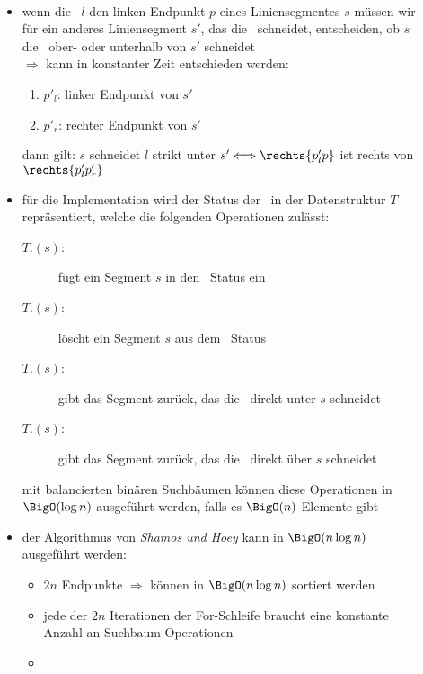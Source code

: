 \begin{description}
	\item[]\ \\\up\up
		\begin{itemize}
			\item wenn die \sweep~$l$ den linken Endpunkt $p$ eines Liniensegmentes $s$ müssen wir für ein anderes Liniensegment $s'$, das die \sweep~schneidet, entscheiden, ob $s$ die \sweep~ober- oder unterhalb von $s'$ schneidet\\
			$\Rightarrow$ kann in konstanter Zeit entschieden werden:
				\begin{enumerate}
					\item $p'_l$: linker Endpunkt von $s'$
					\item $p'_r$: rechter Endpunkt von $s'$
				\end{enumerate}
				dann gilt: $s$ schneidet $l$ strikt unter $s' \Longleftrightarrow \rechts{p'_lp}$ ist rechts von $\rechts{p'_lp'_r}$
			\item für die Implementation wird der Status der \sweep~in der Datenstruktur $T$ repräsentiert, welche die folgenden Operationen zulässt:
				\begin{description}
					\item[$T$.\insert$(s)$:] fügt ein Segment $s$ in den \sweep~Status ein
					\item[$T$.\delete$(s)$:] löscht ein Segment $s$ aus dem \sweep~Status
					\item[$T$.\pred$(s)$:] gibt das Segment zurück, das die \sweep~direkt unter $s$ schneidet
					\item[$T$.\succ$(s)$:] gibt das Segment zurück, das die \sweep~direkt über $s$ schneidet
				\end{description}
			mit balancierten binären Suchbäumen können diese Operationen in $\BigO(\log n)$ ausgeführt werden, falls es $\BigO(n)$ Elemente gibt
			\item der Algorithmus von \textit{Shamos und Hoey} kann in $\BigO(n\log n)$ ausgeführt werden:
				\begin{itemize}
					\item $2n$ Endpunkte $\Rightarrow$ können in $\BigO(n\log n)$ sortiert werden
					\item jede der $2n$ Iterationen der For-Schleife braucht eine konstante Anzahl an Suchbaum-Operationen
					\item {}
				\end{itemize}
		\end{itemize}

\end{description}
